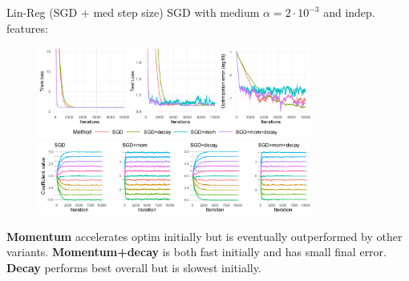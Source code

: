 \documentclass[11pt,compress,t,notes=noshow, xcolor=table]{beamer}
\begin{document}
\begin{vbframe}{Lin-Reg (SGD + med step size)}
\vspace{-0.4cm}
SGD with medium $\alpha=2\cdot10^{-3}$ and indep. features:
\begin{figure}
            \includegraphics[width=0.8\textwidth]{figure_man/simu_linmod/SGD_reg_med_lr_iters.pdf} \\
             \includegraphics[width=0.8\textwidth]{figure_man/simu_linmod/SGD_reg_coef_med.pdf}\\
            \begin{footnotesize}
            \end{footnotesize}
\end{figure}
\textbf{Momentum} accelerates optim initially but is eventually outperformed by other variants. \textbf{Momentum+decay} is both fast initially and has small final error. \textbf{Decay} performs best overall but is slowest initially.
\end{vbframe}
\end{document}

